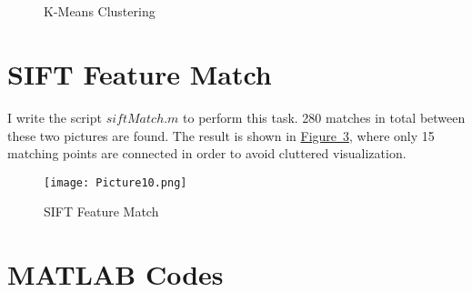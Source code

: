 \documentclass{article}
\begin{document}
\begin{figure}
	\centering
	 \\
\end{figure}
\begin{figure}
	\centering
	 \\
	\caption{K-Means Clustering}
	\label{fig-2}
\end{figure}

\section{SIFT Feature Match}
I write the script \hyperref[code-3]{$siftMatch.m$} to perform this task. 280 matches in total between these two pictures are found. The result is shown in \hyperref[fig-3]{Figure~3}, where only 15 matching points are connected in order to avoid cluttered visualization.
\begin{figure}
	\centering
	\texttt{[image: Picture10.png]}
	\caption{SIFT Feature Match}
	\label{fig-3}
\end{figure}

\appendix
\section{MATLAB Codes}
\end{document}

